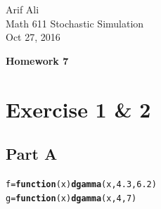 \documentclass{article}\usepackage[]{graphicx}\usepackage[]{color}
\makeatletter
\newcommand{\hlnum}[1]{\textcolor[rgb]{0.686,0.059,0.569}{#1}}%
\newcommand{\hlstd}[1]{\textcolor[rgb]{0.345,0.345,0.345}{#1}}%
\newcommand{\hlkwa}[1]{\textcolor[rgb]{0.161,0.373,0.58}{\textbf{#1}}}%
\newcommand{\hlkwb}[1]{\textcolor[rgb]{0.69,0.353,0.396}{#1}}%
\newcommand{\hlkwc}[1]{\textcolor[rgb]{0.333,0.667,0.333}{#1}}%
\newcommand{\hlkwd}[1]{\textcolor[rgb]{0.737,0.353,0.396}{\textbf{#1}}}%
\newenvironment{kframe}{%
 \def\at@end@of@kframe{}%
 \ifinner\ifhmode%
  \def\at@end@of@kframe{\end{minipage}}%
  \begin{minipage}{\columnwidth}%
 \fi\fi%
 \def\FrameCommand##1{\hskip\@totalleftmargin \hskip-\fboxsep
 \colorbox{shadecolor}{##1}\hskip-\fboxsep
     \hskip-\linewidth \hskip-\@totalleftmargin \hskip\columnwidth}%
 \MakeFramed {\advance\hsize-\width
   \@totalleftmargin\z@ \linewidth\hsize
   \@setminipage}}%
 {\par\unskip\endMakeFramed%
 \at@end@of@kframe}
\newenvironment{knitrout}{}{} %
\makeatother
\begin{document}
\begin{flushright}
Arif Ali\\
Math 611 Stochastic Simulation\\
Oct 27, 2016\\
\end{flushright}

\begin{center}
\LARGE\textbf{Homework 7}
  \end{center}
\section*{Exercise 1 \& 2}
\subsection*{Part A}
\begin{knitrout}
\color{fgcolor}\begin{kframe}
\begin{alltt}
\hlstd{f} \hlkwb{=} \hlkwa{function}\hlstd{(}\hlkwc{x}\hlstd{)} \hlkwd{dgamma}\hlstd{(x,} \hlnum{4.3}\hlstd{,}\hlnum{6.2}\hlstd{)}
\hlstd{g} \hlkwb{=} \hlkwa{function}\hlstd{(}\hlkwc{x}\hlstd{)} \hlkwd{dgamma}\hlstd{(x,} \hlnum{4}\hlstd{,} \hlnum{7}\hlstd{)}



\end{alltt}
\end{kframe}
\end{knitrout}
\end{document}
